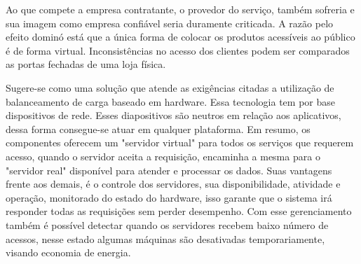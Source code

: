 Ao que compete a empresa contratante, o provedor do serviço, também sofreria e sua imagem como empresa confiável seria
duramente criticada. A razão pelo efeito dominó está que a única forma de colocar os produtos acessíveis ao público é de
forma virtual. Inconsistências no acesso dos clientes podem ser comparados as portas fechadas de uma loja física.


Sugere-se como uma solução que atende as exigências citadas a utilização de balanceamento de carga baseado em hardware.
Essa tecnologia tem por base dispositivos de rede. Esses diapositivos são neutros em relação aos aplicativos, dessa forma
consegue-se atuar em qualquer plataforma. Em resumo, os componentes oferecem um "servidor virtual" para todos os serviços
que requerem acesso, quando o servidor aceita a requisição, encaminha a mesma para o "servidor real" disponível para atender
e processar os dados. Suas vantagens frente aos demais, é o controle dos servidores, sua disponibilidade, atividade e
operação, monitorado do estado do hardware, isso garante que o sistema irá responder todas as requisições sem perder
desempenho. Com esse gerenciamento também é possível detectar quando os servidores recebem baixo número de acessos, nesse
estado algumas máquinas são desativadas temporariamente, visando economia de energia.
